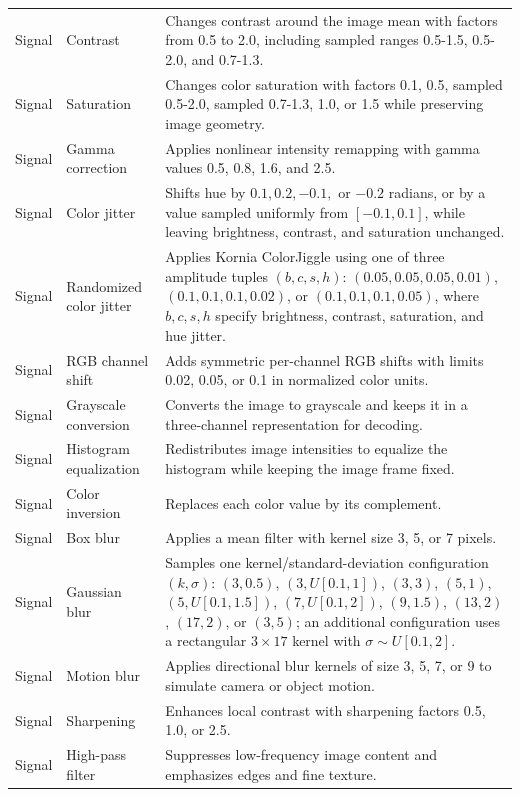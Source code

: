 {\begin{longtable}{@{}>{\raggedright\arraybackslash}p{} >{\raggedright\arraybackslash}p{} >{\raggedright\arraybackslash}p{}@{}}
Signal & Contrast & Changes contrast around the image mean with factors from 0.5 to 2.0, including sampled ranges 0.5-1.5, 0.5-2.0, and 0.7-1.3. \\
Signal & Saturation & Changes color saturation with factors 0.1, 0.5, sampled 0.5-2.0, sampled 0.7-1.3, 1.0, or 1.5 while preserving image geometry. \\
Signal & Gamma correction & Applies nonlinear intensity remapping with gamma values 0.5, 0.8, 1.6, and 2.5. \\
Signal & Color jitter & Shifts hue by \(0.1,0.2,-0.1,\) or \(-0.2\) radians, or by a value sampled uniformly from \([-0.1,0.1]\), while leaving brightness, contrast, and saturation unchanged. \\
Signal & Randomized color jitter & Applies Kornia ColorJiggle using one of three amplitude tuples \((b,c,s,h)\): \((0.05,0.05,0.05,0.01)\), \((0.1,0.1,0.1,0.02)\), or \((0.1,0.1,0.1,0.05)\), where \(b,c,s,h\) specify brightness, contrast, saturation, and hue jitter. \\
Signal & RGB channel shift & Adds symmetric per-channel RGB shifts with limits 0.02, 0.05, or 0.1 in normalized color units. \\
Signal & Grayscale conversion & Converts the image to grayscale and keeps it in a three-channel representation for decoding. \\
Signal & Histogram equalization & Redistributes image intensities to equalize the histogram while keeping the image frame fixed. \\
Signal & Color inversion & Replaces each color value by its complement. \\
Signal & Box blur & Applies a mean filter with kernel size 3, 5, or 7 pixels. \\
Signal & Gaussian blur & Samples one kernel/standard-deviation configuration \((k,\sigma)\): \((3,0.5)\), \((3,U[0.1,1])\), \((3,3)\), \((5,1)\), \((5,U[0.1,1.5])\), \((7,U[0.1,2])\), \((9,1.5)\), \((13,2)\), \((17,2)\), or \((3,5)\); an additional configuration uses a rectangular \(3\times17\) kernel with \(\sigma\sim U[0.1,2]\). \\
Signal & Motion blur & Applies directional blur kernels of size 3, 5, 7, or 9 to simulate camera or object motion. \\
Signal & Sharpening & Enhances local contrast with sharpening factors 0.5, 1.0, or 2.5. \\
Signal & High-pass filter & Suppresses low-frequency image content and emphasizes edges and fine texture. \\

\end{longtable}}
